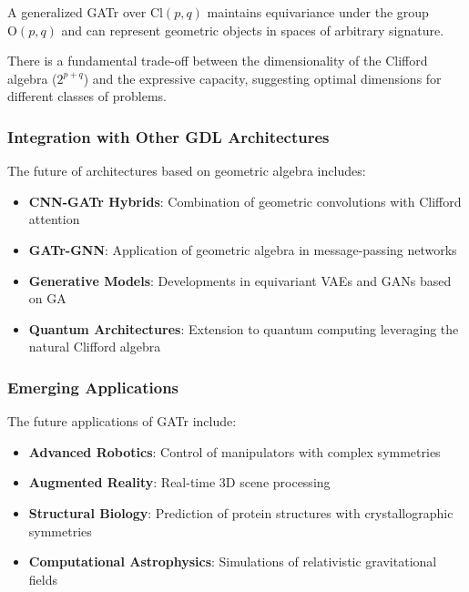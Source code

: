 \begin{definition}\label{def:gatr_generalizado}
A generalized GATr over $\text{Cl}(p,q)$ maintains equivariance under the group $\text{O}(p,q)$ and can represent geometric objects in spaces of arbitrary signature.
\end{definition}

\begin{hypothesis}\label{hyp:escalabilidad_dimensional}
There is a fundamental trade-off between the dimensionality of the Clifford algebra ($2^{p+q}$) and the expressive capacity, suggesting optimal dimensions for different classes of problems.
\end{hypothesis}

\subsubsection{Integration with Other GDL Architectures}

The future of architectures based on geometric algebra includes:

\begin{itemize}
    \item \textbf{CNN-GATr Hybrids}: Combination of geometric convolutions with Clifford attention
    \item \textbf{GATr-GNN}: Application of geometric algebra in message-passing networks
    \item \textbf{Generative Models}: Developments in equivariant VAEs and GANs based on GA
    \item \textbf{Quantum Architectures}: Extension to quantum computing leveraging the natural Clifford algebra
\end{itemize}

\subsubsection{Emerging Applications}

The future applications of GATr include:
\begin{itemize}
    \item \textbf{Advanced Robotics}: Control of manipulators with complex symmetries
    \item \textbf{Augmented Reality}: Real-time 3D scene processing
    \item \textbf{Structural Biology}: Prediction of protein structures with crystallographic symmetries
    \item \textbf{Computational Astrophysics}: Simulations of relativistic gravitational fields
\end{itemize}

